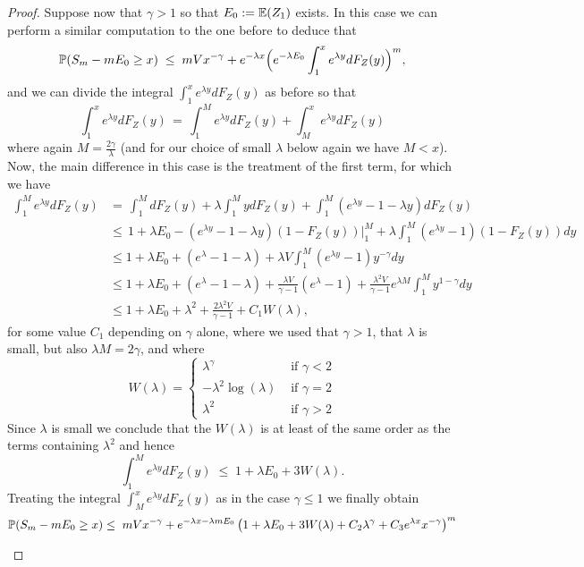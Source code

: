 \begin{proof}
Suppose now that $\gamma>1$ so that $E_0:=\mathbb{E}(Z_1)$ exists. In this case we can perform a similar computation to the one before to deduce that 
\[
    \mathbb{P}(S_m-mE_0\geq x)\;\leq\;mVx^{-\gamma}+e^{-\lambda x}\Big(e^{-\lambda E_0}\int_1^xe^{\lambda y}dF_Z(y)\Big)^m,
\]
and we can divide the integral $\int_1^xe^{\lambda y}dF_Z(y)$ as before so that
\[\int_1^xe^{\lambda y}dF_Z(y)\,=\,\int_1^Me^{\lambda y}dF_Z(y)+\int_M^xe^{\lambda y}dF_Z(y)\]
where again $M=\frac{2\gamma}{\lambda}$ (and for our choice of small $\lambda$ below again we have $M < x$). Now, the main difference in this case is the treatment of the first term, for which we have
\begin{align*}
    \int_1^Me^{\lambda y}dF_Z(y)&=\,\int_1^MdF_Z(y)+\lambda\int_1^MydF_Z(y)+\int_1^M\left(e^{\lambda y}-1-\lambda y\right)dF_Z(y)\\[3pt]&\leq\,1+\lambda E_0-\left(e^{\lambda y}-1-\lambda y\right)(1-F_Z(y))\bigg|^M_1+\lambda\int_1^M\left(e^{\lambda y}-1\right)(1-F_Z(y))dy\\[3pt]&\leq 1+\lambda E_0+\left(e^{\lambda }-1-\lambda\right)+\lambda V\int_1^M\left(e^{\lambda y}-1\right)y^{-\gamma}dy\\[3pt]&\leq 1+\lambda E_0+\left(e^{\lambda }-1-\lambda\right)+\frac{\lambda V}{\gamma-1}\left(e^{\lambda}-1\right)+\frac{\lambda^2 V}{\gamma-1}e^{\lambda M}\int_1^My^{1-\gamma}dy\\[3pt]&\leq 1+\lambda E_0+\lambda^2+\frac{2\lambda^2 V}{\gamma-1}+C_1 W(\lambda),
\end{align*}
for some value $C_1$ depending on $\gamma$ alone, where we used that $\gamma>1$, that $\lambda$ is small, but also $\lambda M=2\gamma$, and where 
\[W(\lambda)=\left\{\begin{array}{cl}\lambda^{\gamma}&\text{ if }\gamma<2\\[3pt]-\lambda^2\log(\lambda)&\text{ if }\gamma=2\\[3pt]\lambda^2&\text{ if }\gamma>2\end{array}\right.\]
Since $\lambda$ is small we conclude that the $W(\lambda)$ is at least of the same order as the terms containing $\lambda^2$ and hence
\[\int_1^Me^{\lambda y}dF_Z(y)\;\leq\;1+\lambda E_0+3W(\lambda).\]
Treating the integral $\int_M^xe^{\lambda y}dF_Z(y)$ as in the case $\gamma\leq 1$ we finally obtain 
\begin{align*}\PP(S_m-mE_0\geq x)&\leq\;mVx^{-\gamma}+e^{-\lambda x-\lambda mE_0}\left(1+\lambda E_0+3W(\lambda)+C_2\lambda^{\gamma}+ C_3e^{\lambda x}x^{-\gamma}\right)^m\\[4pt]

\end{align*}
\end{proof}
